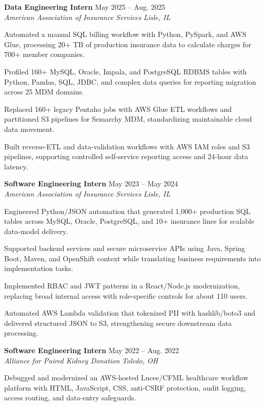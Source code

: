 \documentclass[letterpaper,11pt]{article}
\newcommand{\resumeSubheading}[4]{
  \textbf{#1} \hfill #2\\
  \textit{#3} \hfill \textit{#4}
}
\begin{document}
\resumeSubheading
{Data Engineering Intern}{May 2025 -- Aug. 2025}
{American Association of Insurance Services}{Lisle, IL}
\begin{tightitemize}
  \item Automated a manual SQL billing workflow with Python, PySpark, and AWS Glue, processing 20+ TB of production insurance data to calculate charges for 700+ member companies.
  \item Profiled 160+ MySQL, Oracle, Impala, and PostgreSQL RDBMS tables with Python, Pandas, SQL, JDBC, and complex data queries for reporting migration across 25 MDM domains.
  \item Replaced 160+ legacy Pentaho jobs with AWS Glue ETL workflows and partitioned S3 pipelines for Semarchy MDM, standardizing maintainable cloud data movement.
  \item Built reverse-ETL and data-validation workflows with AWS IAM roles and S3 pipelines, supporting controlled self-service reporting access and 24-hour data latency.
\end{tightitemize}

\resumeSubheading
{Software Engineering Intern}{May 2023 -- May 2024}
{American Association of Insurance Services}{Lisle, IL}
\begin{tightitemize}
  \item Engineered Python/JSON automation that generated 1,000+ production SQL tables across MySQL, Oracle, PostgreSQL, and 10+ insurance lines for scalable data-model delivery.
  \item Supported backend services and secure microservice APIs using Java, Spring Boot, Maven, and OpenShift context while translating business requirements into implementation tasks.
  \item Implemented RBAC and JWT patterns in a React/Node.js modernization, replacing broad internal access with role-specific controls for about 110 users.
  \item Automated AWS Lambda validation that tokenized PII with hashlib/boto3 and delivered structured JSON to S3, strengthening secure downstream data processing.
\end{tightitemize}

\resumeSubheading
{Software Engineering Intern}{May 2022 -- Aug. 2022}
{Alliance for Paired Kidney Donation}{Toledo, OH}
\begin{tightitemize}
  \item Debugged and modernized an AWS-hosted Lucee/CFML healthcare workflow platform with HTML, JavaScript, CSS, anti-CSRF protection, audit logging, access routing, and data-entry safeguards.
\end{tightitemize}
\end{document}
